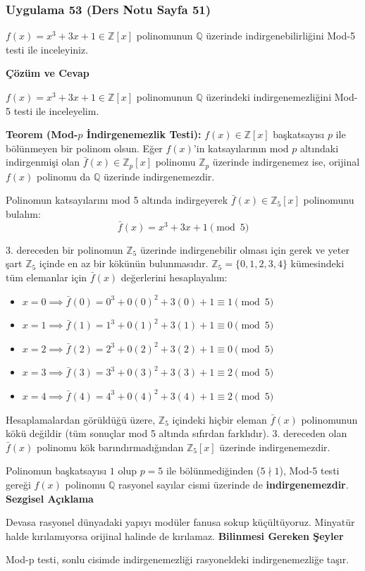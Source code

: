 \documentclass[11pt, a4paper]{article}
\newenvironment{cozum}{
    \vspace{0.5cm}
    \noindent\textcolor{green!60!black}{\faCheckCircle\enspace \textbf{\Large Çözüm ve Cevap}}\par\vspace{0.2cm}
}{}
\newenvironment{sezgisel}{
    \vspace{0.5cm}
    \noindent\textcolor{orange!80!black}{\faLightbulb\enspace \textbf{\Large Sezgisel Açıklama}}\par\vspace{0.2cm}
    \itshape
}{}
\newenvironment{bilgi}{
    \vspace{0.5cm}
    \noindent\textcolor{red!70!black}{\faExclamationTriangle\enspace \textbf{\Large Bilinmesi Gereken Şeyler}}\par\vspace{0.2cm}
}{}
\begin{document}
\newpage
\subsubsection{Uygulama 53 (Ders Notu Sayfa 51)}
\begin{sorubox}
$f(x)=x^3+3x+1 \in \mathbb{Z}[x]$ polinomunun $\mathbb{Q}$ üzerinde indirgenebilirliğini Mod-5 testi ile inceleyiniz.
\end{sorubox}
\begin{cozum}
$f(x) = x^{3} + 3x + 1 \in \mathbb{Z}[x]$ polinomunun $\mathbb{Q}$ üzerindeki indirgenemezliğini Mod-5 testi ile inceleyelim.

\textbf{Teorem (Mod-$p$ İndirgenemezlik Testi):} $f(x) \in \mathbb{Z}[x]$ başkatsayısı $p$ ile bölünmeyen bir polinom olsun. Eğer $f(x)$'in katsayılarının mod $p$ altındaki indirgenmişi olan $\bar{f}(x) \in \mathbb{Z}_p[x]$ polinomu $\mathbb{Z}_p$ üzerinde indirgenemez ise, orijinal $f(x)$ polinomu da $\mathbb{Q}$ üzerinde indirgenemezdir.

Polinomun katsayılarını mod 5 altında indirgeyerek $\bar{f}(x) \in \mathbb{Z}_{5}[x]$ polinomunu bulalım:
\[ \bar{f}(x) = x^{3} + 3x + 1 \pmod{5} \]

3. dereceden bir polinomun $\mathbb{Z}_{5}$ üzerinde indirgenebilir olması için gerek ve yeter şart $\mathbb{Z}_{5}$ içinde en az bir kökünün bulunmasıdır. $\mathbb{Z}_{5} = \{0, 1, 2, 3, 4\}$ kümesindeki tüm elemanlar için $\bar{f}(x)$ değerlerini hesaplayalım:
\begin{itemize}
    \item $x = 0 \implies \bar{f}(0) = 0^3 + 0(0)^2 + 3(0) + 1 \equiv 1 \pmod{5}$
    \item $x = 1 \implies \bar{f}(1) = 1^3 + 0(1)^2 + 3(1) + 1 \equiv 0 \pmod{5}$
    \item $x = 2 \implies \bar{f}(2) = 2^3 + 0(2)^2 + 3(2) + 1 \equiv 0 \pmod{5}$
    \item $x = 3 \implies \bar{f}(3) = 3^3 + 0(3)^2 + 3(3) + 1 \equiv 2 \pmod{5}$
    \item $x = 4 \implies \bar{f}(4) = 4^3 + 0(4)^2 + 3(4) + 1 \equiv 2 \pmod{5}$
\end{itemize}

Hesaplamalardan görüldüğü üzere, $\mathbb{Z}_{5}$ içindeki hiçbir eleman $\bar{f}(x)$ polinomunun kökü değildir (tüm sonuçlar mod 5 altında sıfırdan farklıdır). 3. dereceden olan $\bar{f}(x)$ polinomu kök barındırmadığından $\mathbb{Z}_{5}[x]$ üzerinde indirgenemezdir.

Polinomun başkatsayısı $1$ olup $p = 5$ ile bölünmediğinden ($5 \nmid 1$), Mod-5 testi gereği $f(x)$ polinomu $\mathbb{Q}$ rasyonel sayılar cismi üzerinde de \textbf{indirgenemezdir}.
\end{cozum}
\begin{sezgisel}
Devasa rasyonel dünyadaki yapıyı modüler fanusa sokup küçültüyoruz. Minyatür halde kırılamıyorsa orijinal halinde de kırılamaz.
\end{sezgisel}
\begin{bilgi}
Mod-p testi, sonlu cisimde indirgenemezliği rasyoneldeki indirgenemezliğe taşır.
\end{bilgi}
\end{document}
